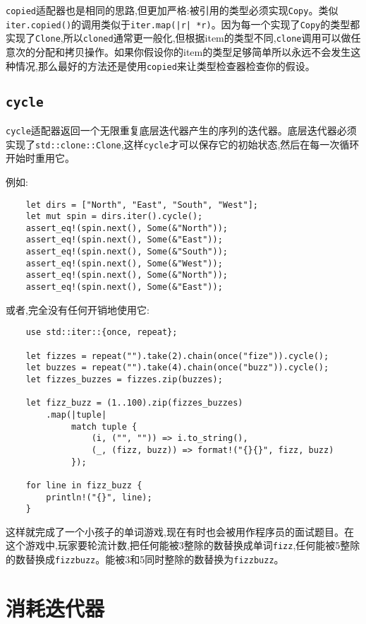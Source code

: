 \texttt{copied}适配器也是相同的思路,但更加严格:被引用的类型必须实现\texttt{Copy}。类似\texttt{iter.copied()}的调用类似于\texttt{iter.map(|r| *r)}。因为每一个实现了\texttt{Copy}的类型都实现了\texttt{Clone},所以\texttt{cloned}通常更一般化,但根据item的类型不同,\texttt{clone}调用可以做任意次的分配和拷贝操作。如果你假设你的item的类型足够简单所以永远不会发生这种情况,那么最好的方法还是使用\texttt{copied}来让类型检查器检查你的假设。

\subsection{\texttt{cycle}}
\texttt{cycle}适配器返回一个无限重复底层迭代器产生的序列的迭代器。底层迭代器必须实现了\texttt{std::clone::Clone},这样\texttt{cycle}才可以保存它的初始状态,然后在每一次循环开始时重用它。

例如:
\begin{verbatim}
    let dirs = ["North", "East", "South", "West"];
    let mut spin = dirs.iter().cycle();
    assert_eq!(spin.next(), Some(&"North"));
    assert_eq!(spin.next(), Some(&"East"));
    assert_eq!(spin.next(), Some(&"South"));
    assert_eq!(spin.next(), Some(&"West"));
    assert_eq!(spin.next(), Some(&"North"));
    assert_eq!(spin.next(), Some(&"East"));
\end{verbatim}

或者,完全没有任何开销地使用它:
\begin{verbatim}
    use std::iter::{once, repeat};

    let fizzes = repeat("").take(2).chain(once("fize")).cycle();
    let buzzes = repeat("").take(4).chain(once("buzz")).cycle();
    let fizzes_buzzes = fizzes.zip(buzzes);

    let fizz_buzz = (1..100).zip(fizzes_buzzes)
        .map(|tuple|
             match tuple {
                 (i, ("", "")) => i.to_string(),
                 (_, (fizz, buzz)) => format!("{}{}", fizz, buzz)
             });
    
    for line in fizz_buzz {
        println!("{}", line);
    }
\end{verbatim}

这样就完成了一个小孩子的单词游戏,现在有时也会被用作程序员的面试题目。在这个游戏中,玩家要轮流计数,把任何能被3整除的数替换成单词\texttt{fizz},任何能被5整除的数替换成\texttt{fizzbuzz}。能被3和5同时整除的数替换为\texttt{fizzbuzz}。

\section{消耗迭代器}

